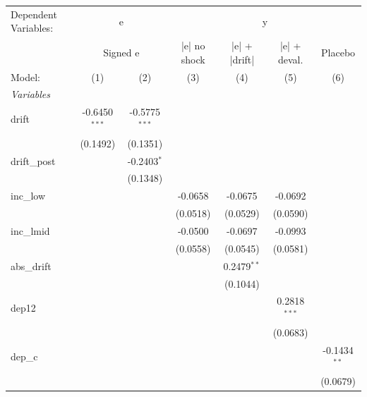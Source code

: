 
\begingroup
\centering
\begin{tabular}{lcccccc}
   \tabularnewline \midrule \midrule
   Dependent Variables: & \multicolumn{2}{c}{e} & \multicolumn{4}{c}{y}\\
    & \multicolumn{2}{c}{Signed e} & |e| no shock & |e| + |drift| & |e| + deval. & Placebo \\ 
   Model:       & (1)             & (2)             & (3)      & (4)           & (5)            & (6)\\  
   \midrule
   \emph{Variables}\\
   drift        & -0.6450$^{***}$ & -0.5775$^{***}$ &          &               &                &   \\   
                & (0.1492)        & (0.1351)        &          &               &                &   \\   
   drift\_post  &                 & -0.2403$^{*}$   &          &               &                &   \\   
                &                 & (0.1348)        &          &               &                &   \\   
   inc\_low     &                 &                 & -0.0658  & -0.0675       & -0.0692        &   \\   
                &                 &                 & (0.0518) & (0.0529)      & (0.0590)       &   \\   
   inc\_lmid    &                 &                 & -0.0500  & -0.0697       & -0.0993        &   \\   
                &                 &                 & (0.0558) & (0.0545)      & (0.0581)       &   \\   
   abs\_drift   &                 &                 &          & 0.2479$^{**}$ &                &   \\   
                &                 &                 &          & (0.1044)      &                &   \\   
   dep12        &                 &                 &          &               & 0.2818$^{***}$ &   \\   
                &                 &                 &          &               & (0.0683)       &   \\   
   dep\_c       &                 &                 &          &               &                & -0.1434$^{**}$\\   
                &                 &                 &          &               &                & (0.0679)\\   

\end{tabular}
